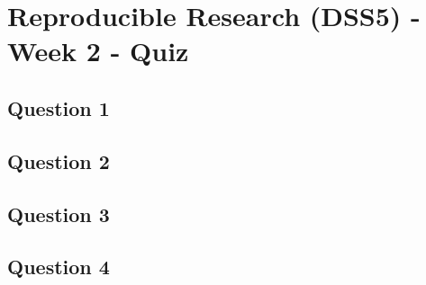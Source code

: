 \documentclass[french]{article}
\begin{document}
\section*{Reproducible Research (DSS5) - Week 2 - Quiz}
\newpage
\subsection*{Question 1}

\newpage
\subsection*{Question 2}


\newpage
\subsection*{Question 3}


\newpage
\subsection*{Question 4}
\end{document}
